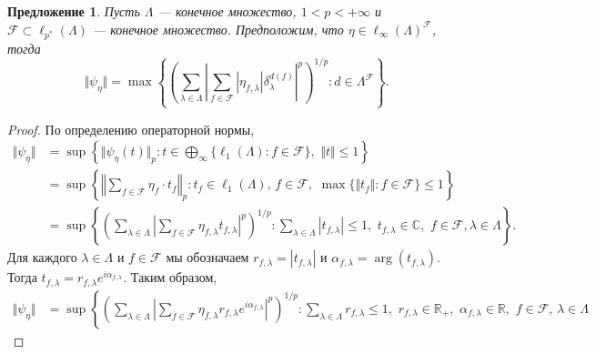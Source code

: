 \documentclass[12pt]{article}
\newtheorem{proposition}[theorem]{Предложение}
\begin{document}
\begin{proposition}\label{ExtMorphNorm}
    Пусть $\Lambda$ --- конечное множество, $1<p<+\infty$ 
    и $\mathcal{F}\subset\ell_{p^*}(\Lambda)$ --- конечное множество. 
    Предположим, что $\eta\in\ell_\infty(\Lambda)^\mathcal{F}$, тогда 
    \[
        \Vert \psi_{\eta}\Vert
        =\max\left\{
            \left(\sum_{\lambda\in\Lambda}
                \left|
                    \sum_{f\in\mathcal{F}} |\eta_{f,\lambda}| 
                    \delta_{\lambda}^{d(f)}
                \right|^p
            \right)^{1/p} : 
            d\in\Lambda^\mathcal{F}
        \right\}.
    \]
\end{proposition}
\begin{proof}
    По определению операторной нормы,
    \[
    \begin{aligned}
        \Vert\psi_{\eta}\Vert
        &=\sup\left\{
            \Vert\psi_{\eta}(t)\Vert_p:
            t\in \bigoplus_\infty\{\ell_1(\Lambda):f\in\mathcal{F}\},\,\,
            \Vert t\Vert\leq 1
        \right\} \\
        &=\sup\left\{
            \left \Vert\sum_{f\in\mathcal{F}}\eta_f\cdot t_f\right \Vert_p:
            t_f\in\ell_1(\Lambda),\, f\in\mathcal{F},\,\,
            \max\{\Vert t_f\Vert:f\in\mathcal{F}\}\leq 1
        \right\} \\
        &=\sup\left\{
            \left(\sum_{\lambda\in\Lambda}
                \left|
                    \sum_{f\in\mathcal{F}}\eta_{f,\lambda} t_{f,\lambda}
                \right|^p
            \right)^{1/p}:
            \sum_{\lambda\in\Lambda} |t_{f,\lambda}|\leq 1,\,\, 
            t_{f,\lambda}\in\mathbb{C},\,\, f\in\mathcal{F}, \lambda\in\Lambda
        \right\}.
    \end{aligned}
    \]
    Для каждого $\lambda\in\Lambda$ и $f\in\mathcal{F}$ мы обозначаем 
    $r_{f,\lambda}=|t_{f,\lambda}|$ 
    и $\alpha_{f,\lambda}=\operatorname{arg}(t_{f,\lambda})$. 
    Тогда $t_{f,\lambda}=r_{f,\lambda} e^{i \alpha_{f,\lambda}}$. Таким образом,
    \[
    \begin{aligned}
        \Vert \psi_{\eta}\Vert
        &=\sup\left\{
            \left(\sum_{\lambda\in\Lambda}
                \left|
                    \sum_{f\in\mathcal{F}}
                        \eta_{f,\lambda} r_{f,\lambda} e^{i \alpha_{f,\lambda}}
                \right|^p
            \right)^{1/p}:
            \sum_{\lambda\in\Lambda} r_{f,\lambda}\leq 1,\,\, 
            r_{f,\lambda}\in\mathbb{R}_+,\,\, 
            \alpha_{f,\lambda}\in\mathbb{R},\,\, 
            f\in\mathcal{F},\, \lambda\in\Lambda

\end{aligned}\]
\end{proof}
\end{document}
